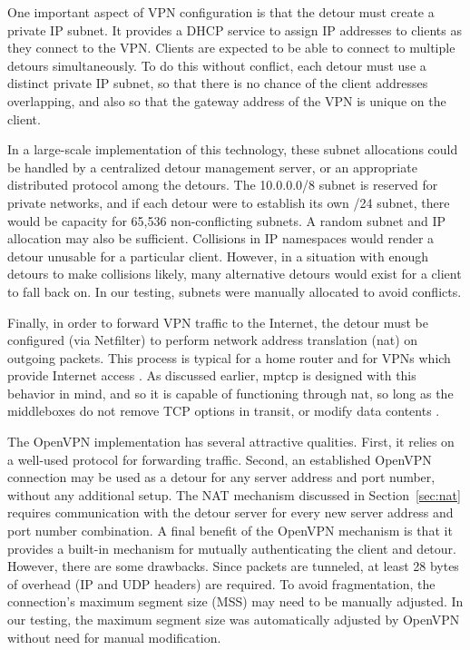 \documentclass{cwru}
\begin{document}
One important aspect of VPN configuration is that the detour must create a
private IP subnet. It provides a DHCP service \cite{rfc2131} to assign IP
addresses to clients as they connect to the VPN. Clients are expected to be able
to connect to multiple detours simultaneously. To do this without conflict, each
detour must use a distinct private IP subnet, so that there is no chance of the
client addresses overlapping, and also so that the gateway address of the VPN is
unique on the client.

In a large-scale implementation of this technology, these subnet allocations
could be handled by a centralized detour management server, or an appropriate
distributed protocol among the detours. The 10.0.0.0/8 subnet is reserved for
private networks, and if each detour were to establish its own /24 subnet, there
would be capacity for 65,536 non-conflicting subnets. A random subnet and IP
allocation may also be sufficient. Collisions in IP namespaces would render a
detour unusable for a particular client. However, in a situation with enough
detours to make collisions likely, many alternative detours would exist for a
client to fall back on. In our testing, subnets were manually allocated to avoid
conflicts.

Finally, in order to forward VPN traffic to the Internet, the detour must be
configured (via Netfilter) to perform network address translation (\ac{nat}) on
outgoing packets. This process is typical for a home router and for VPNs which
provide Internet access \cite{rfc3022,yonan2007openvpn}. As discussed earlier,
\ac{mptcp} is designed with this behavior in mind, and so it is capable of
functioning through \ac{nat}, so long as the middleboxes do not remove TCP
options in transit, or modify data contents \cite{rfc6182}.

The OpenVPN implementation has several attractive qualities. First, it relies on
a well-used protocol for forwarding traffic. Second, an established OpenVPN
connection may be used as a detour for any server address and port number,
without any additional setup. The NAT mechanism discussed in
Section~\ref{sec:nat} requires communication with the detour server for every
new server address and port number combination. A final benefit of the OpenVPN
mechanism is that it provides a built-in mechanism for mutually authenticating
the client and detour. However, there are some drawbacks. Since packets are
tunneled, at least 28 bytes of overhead (IP and UDP headers) are required. To
avoid fragmentation, the connection's maximum segment size (MSS) may need to be
manually adjusted. In our testing, the maximum segment size was automatically
adjusted by OpenVPN without need for manual modification.
\end{document}

